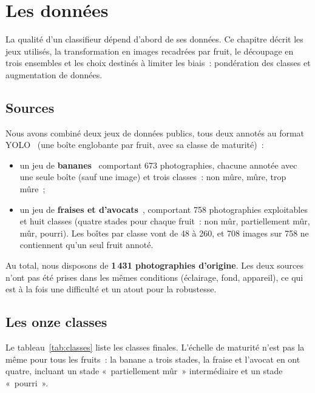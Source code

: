 \chapter{Les données}\label{chap:donnees}

La qualité d’un classifieur dépend d’abord de ses données. Ce chapitre décrit les jeux utilisés, la transformation en images recadrées par fruit, le découpage en trois ensembles et les choix destinés à limiter les biais~: pondération des classes et augmentation de données.

\section{Sources}

Nous avons combiné deux jeux de données publics, tous deux annotés au format YOLO~\cite{redmon2016} (une boîte englobante par fruit, avec sa classe de maturité)~:

\begin{itemize}
  \item un jeu de \textbf{bananes}~\cite{banane_ds} comportant 673 photographies, chacune annotée avec une seule boîte (sauf une image) et trois classes~: non mûre, mûre, trop mûre~;
  \item un jeu de \textbf{fraises et d’avocats}~\cite{dib2025}, comportant 758 photographies exploitables et huit classes (quatre stades pour chaque fruit~: non mûr, partiellement mûr, mûr, pourri). Les boîtes par classe vont de 48 à 260, et 708 images sur 758 ne contiennent qu’un seul fruit annoté.
\end{itemize}

Au total, nous disposons de \textbf{1\,431 photographies d’origine}. Les deux sources n’ont pas été prises dans les mêmes conditions (éclairage, fond, appareil), ce qui est à la fois une difficulté et un atout pour la robustesse.

\section{Les onze classes}

Le tableau~\ref{tab:classes} liste les classes finales. L’échelle de maturité n’est pas la même pour tous les fruits~: la banane a trois stades, la fraise et l’avocat en ont quatre, incluant un stade «~partiellement mûr~» intermédiaire et un stade «~pourri~».

